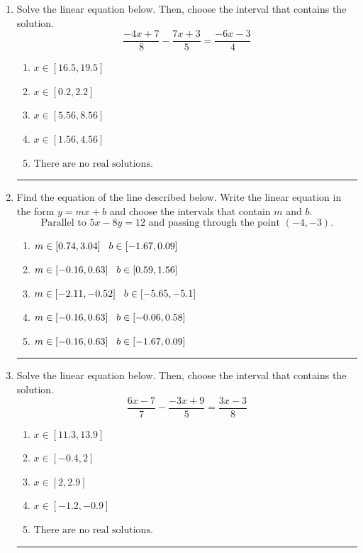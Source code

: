 \documentclass[14pt]{extbook}
\newcommand{\litem}[1]{\item#1\hspace*{-1cm}\rule{\textwidth}{0.4pt}}
\begin{document}
\begin{enumerate}
{\begin{enumerate}[label=\Alph*.]
\end{enumerate} }
\litem{
Solve the linear equation below. Then, choose the interval that contains the solution.\[ \frac{-4x + 7}{8} - \frac{7x + 3}{5} = \frac{-6x -3}{4} \]\begin{enumerate}[label=\Alph*.]
\item \( x \in [16.5, 19.5] \)
\item \( x \in [0.2, 2.2] \)
\item \( x \in [5.56, 8.56] \)
\item \( x \in [1.56, 4.56] \)
\item \( \text{There are no real solutions.} \)

\end{enumerate} }
\litem{
Find the equation of the line described below. Write the linear equation in the form $ y=mx+b $ and choose the intervals that contain $m$ and $b$.\[ \text{Parallel to } 5 x - 8 y = 12 \text{ and passing through the point } (-4, -3). \]\begin{enumerate}[label=\Alph*.]
\item \( m \in [0.74, 3.04] \hspace*{3mm} b \in [-1.67, 0.09] \)
\item \( m \in [-0.16, 0.63] \hspace*{3mm} b \in [0.59, 1.56] \)
\item \( m \in [-2.11, -0.52] \hspace*{3mm} b \in [-5.65, -5.1] \)
\item \( m \in [-0.16, 0.63] \hspace*{3mm} b \in [-0.06, 0.58] \)
\item \( m \in [-0.16, 0.63] \hspace*{3mm} b \in [-1.67, 0.09] \)

\end{enumerate} }
\litem{
Solve the linear equation below. Then, choose the interval that contains the solution.\[ \frac{6x -7}{7} - \frac{-3x + 9}{5} = \frac{3x -3}{8} \]\begin{enumerate}[label=\Alph*.]
\item \( x \in [11.3, 13.9] \)
\item \( x \in [-0.4, 2] \)
\item \( x \in [2, 2.9] \)
\item \( x \in [-1.2, -0.9] \)
\item \( \text{There are no real solutions.} \)


\end{enumerate}}
\end{enumerate}
\end{document}

